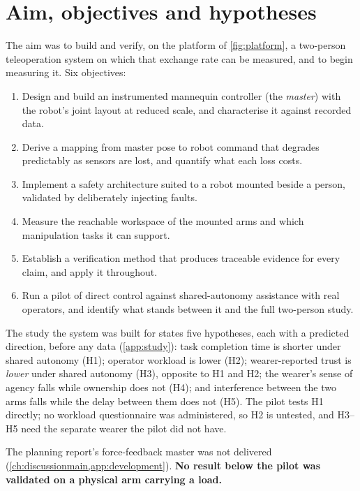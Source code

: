 \section{Aim, objectives and hypotheses}
\label{sec:aim}

The aim was to build and verify, on the platform of \cref{fig:platform}, a
two-person teleoperation system on which that exchange rate can be
measured, and to begin measuring it. Six objectives:

\begin{enumerate}
  \item Design and build an instrumented mannequin controller (the
    \emph{master}) with the robot's joint layout at reduced scale, and
    characterise it against recorded data.
  \item Derive a mapping from master pose to robot command that degrades
    predictably as sensors are lost, and quantify what each loss costs.
  \item Implement a safety architecture suited to a robot mounted beside a
    person, validated by deliberately injecting faults.
  \item Measure the reachable workspace of the mounted arms and which
    manipulation tasks it can support.
  \item Establish a verification method that produces traceable evidence
    for every claim, and apply it throughout.
  \item Run a pilot of direct control against shared-autonomy assistance
    with real operators, and identify what stands between it and the full
    two-person study.
\end{enumerate}

The study the system was built for states five hypotheses, each with a
predicted direction, before any data (\cref{app:study}): task completion
time is shorter under shared autonomy (H1); operator workload is lower
(H2); wearer-reported trust is \emph{lower} under shared autonomy (H3),
opposite to H1 and H2; the wearer's sense of agency falls while ownership
does not (H4); and interference between the two arms falls while the delay
between them does not (H5). The pilot tests H1 directly; no workload
questionnaire was administered, so H2 is untested, and H3--H5 need the
separate wearer the pilot did not have.

The planning report's force-feedback master was not delivered
(\cref{ch:discussionmain,app:development}). \textbf{No result below the
pilot was validated on a physical arm carrying a load.}
